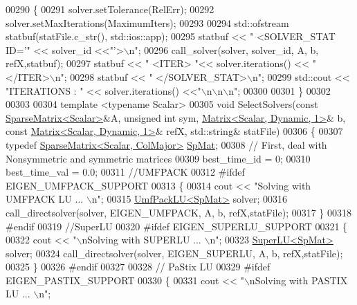 \begin{DoxyCode}
00290 \{
00291   solver.setTolerance(RelErr); 
00292   solver.setMaxIterations(MaximumIters);
00293   
00294   std::ofstream statbuf(statFile.c\_str(), std::ios::app);
00295   statbuf << \textcolor{stringliteral}{" <SOLVER\_STAT ID='"} << solver\_id <<\textcolor{stringliteral}{"'>\(\backslash\)n"}; 
00296   call\_solver(solver, solver\_id, A, b, refX,statbuf); 
00297   statbuf << \textcolor{stringliteral}{"   <ITER> "}<< solver.iterations() << \textcolor{stringliteral}{"</ITER>\(\backslash\)n"};
00298   statbuf << \textcolor{stringliteral}{" </SOLVER\_STAT>\(\backslash\)n"};
00299   std::cout << \textcolor{stringliteral}{"ITERATIONS : "} << solver.iterations() <<\textcolor{stringliteral}{"\(\backslash\)n\(\backslash\)n\(\backslash\)n"}; 
00300   
00301 \}
00302 
00303 
00304 \textcolor{keyword}{template} <\textcolor{keyword}{typename} Scalar>
00305 \textcolor{keywordtype}{void} SelectSolvers(\textcolor{keyword}{const} \hyperlink{group___sparse_core___module}{SparseMatrix<Scalar>}&A, \textcolor{keywordtype}{unsigned} \textcolor{keywordtype}{int} sym, 
      \hyperlink{group___core___module}{Matrix<Scalar, Dynamic, 1>}& b, \textcolor{keyword}{const} 
      \hyperlink{group___core___module}{Matrix<Scalar, Dynamic, 1>}& refX, std::string& statFile)
00306 \{
00307   \textcolor{keyword}{typedef} \hyperlink{group___sparse_core___module}{SparseMatrix<Scalar, ColMajor>} \hyperlink{group___sparse_core___module}{SpMat}; 
00308   \textcolor{comment}{// First, deal with Nonsymmetric and symmetric matrices}
00309   best\_time\_id = 0; 
00310   best\_time\_val = 0.0;
00311   \textcolor{comment}{//UMFPACK}
00312 \textcolor{preprocessor}{  #ifdef EIGEN\_UMFPACK\_SUPPORT}
00313   \{
00314     cout << \textcolor{stringliteral}{"Solving with UMFPACK LU ... \(\backslash\)n"}; 
00315     \hyperlink{class_eigen_1_1_umf_pack_l_u}{UmfPackLU<SpMat>} solver; 
00316     call\_directsolver(solver, EIGEN\_UMFPACK, A, b, refX,statFile); 
00317   \}
00318 \textcolor{preprocessor}{  #endif}
00319     \textcolor{comment}{//SuperLU}
00320 \textcolor{preprocessor}{  #ifdef EIGEN\_SUPERLU\_SUPPORT}
00321   \{
00322     cout << \textcolor{stringliteral}{"\(\backslash\)nSolving with SUPERLU ... \(\backslash\)n"}; 
00323     \hyperlink{class_eigen_1_1_super_l_u}{SuperLU<SpMat>} solver;
00324     call\_directsolver(solver, EIGEN\_SUPERLU, A, b, refX,statFile); 
00325   \}
00326 \textcolor{preprocessor}{  #endif}
00327     
00328    \textcolor{comment}{// PaStix LU}
00329 \textcolor{preprocessor}{  #ifdef EIGEN\_PASTIX\_SUPPORT}
00330   \{
00331     cout << \textcolor{stringliteral}{"\(\backslash\)nSolving with PASTIX LU ... \(\backslash\)n"}; 

\end{DoxyCode}
